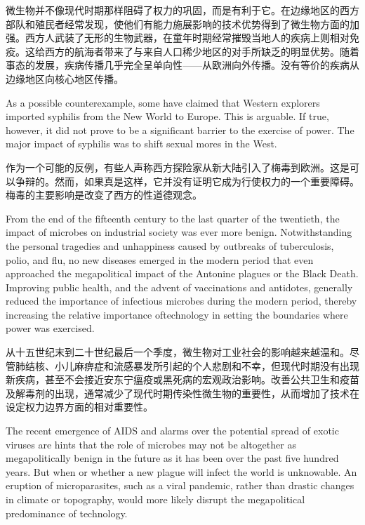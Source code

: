 \begin{Parallel}{97mm}{45mm}
  \ParallelRText
  {微生物并不像现代时期那样阻碍了权力的巩固，而是有利于它。在边缘地区的西方部队和殖民者经常发现，使他们有能力施展影响的技术优势得到了微生物方面的加强。西方人武装了无形的生物武器，在童年时期经常摧毁当地人的疾病上则相对免疫。这给西方的航海者带来了与来自人口稀少地区的对手所缺乏的明显优势。随着事态的发展，疾病传播几乎完全呈单向性——从欧洲向外传播。没有等价的疾病从边缘地区向核心地区传播。}
  \ParallelPar



  \ParallelLText
  {As a possible counterexample, some have claimed that Western explorers imported syphilis from the New World to Europe. This is arguable. If true, however, it did not prove to be a significant barrier to the exercise of power. The major impact of syphilis was to shift sexual mores in the West.}
  
  \ParallelRText
  {作为一个可能的反例，有些人声称西方探险家从新大陆引入了梅毒到欧洲。这是可以争辩的。然而，如果真是这样，它并没有证明它成为行使权力的一个重要障碍。梅毒的主要影响是改变了西方的性道德观念。}
  \ParallelPar


  \ParallelLText
  {From the end of the fifteenth century to the last quarter of the twentieth, the impact of microbes on industrial society was ever more benign. Notwithstanding the personal tragedies and unhappiness caused by outbreaks of tuberculosis, polio, and flu, no new diseases emerged in the modern period that even approached the megapolitical impact of the Antonine plagues or the Black Death. Improving public health, and the advent of vaccinations and antidotes, generally reduced the importance of infectious microbes during the modern period, thereby increasing the relative importance oftechnology in setting the boundaries where power was exercised.}
  
  \ParallelRText
  {从十五世纪末到二十世纪最后一个季度，微生物对工业社会的影响越来越温和。尽管肺结核、小儿麻痹症和流感暴发所引起的个人悲剧和不幸，但现代时期没有出现新疾病，甚至不会接近安东宁瘟疫或黑死病的宏观政治影响。改善公共卫生和疫苗及解毒剂的出现，通常减少了现代时期传染性微生物的重要性，从而增加了技术在设定权力边界方面的相对重要性。}
  \ParallelPar


  \ParallelLText
  {The recent emergence of AIDS and alarms over the potential spread of exotic viruses are hints that the role of microbes may not be altogether as megapolitically benign in the future as it has been over the past five hundred years. But when or whether a new plague will infect the world is unknowable. An eruption of microparasites, such as a viral pandemic, rather than drastic changes in climate or topography, would more likely disrupt the megapolitical predominance of technology.}
  

\end{Parallel}
